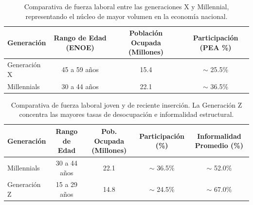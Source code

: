 \begin{table}[H]
    \centering
    \caption[Participación laboral: Generación X y Millennials]{
    Comparativa de fuerza laboral entre las generaciones X y Millennial,
    representando el núcleo de mayor volumen en la economía nacional.}
    \label{tab:genx_millennials}
    \fontsize{9.5pt}{11.5pt}\selectfont
    \begin{tabular}{|l|c|c|c|}
        \hline
        \textbf{Generación} & \textbf{Rango de Edad (ENOE)} & \textbf{Población Ocupada (Millones)} & \textbf{Participación (PEA \%)} \\
        \hline
        Generación X & 45 a 59 años & 15.4 & $\sim$ 25.5\% \\
        \hline
        Millennials & 30 a 44 años & 22.1 & $\sim$ 36.5\% \\
        \hline
    \end{tabular}
    \vspace{1ex}
\end{table}

\begin{table}[H]
    \centering
    \caption[Participación y precarización laboral: Millennials y Generación Z]{
    Comparativa de fuerza laboral joven y de reciente inserción. La Generación Z
    concentra las mayores tasas de desocupación e informalidad estructural.}
    \label{tab:millennials_genz}
    \fontsize{9.5pt}{11.5pt}\selectfont
    \begin{tabular}{|l|c|c|c|c|}
        \hline
        \textbf{Generación} & \textbf{Rango de Edad} & \textbf{Pob. Ocupada (Millones)} & \textbf{Participación (\%)} & \textbf{Informalidad Promedio (\%)} \\
        \hline
        Millennials & 30 a 44 años & 22.1 & $\sim$ 36.5\% & $\sim$ 52.0\% \\
        \hline
        Generación Z & 15 a 29 años & 14.8 & $\sim$ 24.5\% & $\sim$ 67.0\% \\
        \hline
    \end{tabular}
    \vspace{1ex}
\end{table}

